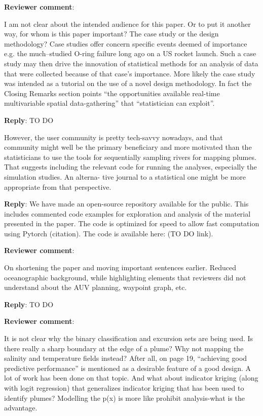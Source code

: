 \documentclass[a4paper]{article}
\newcounter{reviewer}
\def\revcom{\textbf{Reviewer comment}}
\def\reply{\textbf{Reply}}
\begin{document}
\begin{answers}
\item{\revcom  :}\label{r1c4}

I am not clear about the intended audience for this paper. Or to put it another way, for whom is this paper important? The case study or the
design methodology? Case studies offer concern specific events deemed of importance e.g. the much–studied O-ring failure long ago on a US rocket launch. Such a case study may then drive the innovation of statistical methods for an analysis of data that were collected because of that case’s importance. More likely the case study was intended as a tutorial on the use of a novel design methodology. In fact the Closing Remarks section points “the opportunities available real-time multivariable spatial data-gathering” that “statistician can exploit”.

\reply: TO DO

However, the user community is pretty tech-savvy nowadays, and that community might well be the primary beneficiary and more motivated than the statisticians to use the tools for sequentially sampling rivers for mapping plumes. That suggests including the relevant code for running the analyses, especially the simulation studies. An alterna- tive journal to a statistical one might be more appropriate from that perspective.

\reply: We have made an open-source repository available for the public. This includes commented code examples for exploration and analysis of the material presented in the paper. The code is optimized for speed to allow fast computation using Pytorch (citation). The code is available here: (TO DO link). 

\item{\revcom :}\label{r1c5}

On shortening the paper and moving important sentences earlier. Reduced oceanographic background, while highlighting elements that reviewers did not understand about the AUV planning, waypoint graph, etc.

\reply: TO DO

\item{\revcom :}\label{r1c6}

It is not clear why the binary classification and excursion sets are being used. Is there really a sharp boundary at the edge of a plume? Why not mapping the salinity and temperature fields instead? After all, on page 19, “achieving good predictive performance” is mentioned as a desirable feature of a good design. A lot of work has been done on that topic. And what about indicator kriging (along with logit regression) that generalizes indicator kriging that has been used to identify plumes? Modelling the p(x) is more like prohibit analysis-what is the advantage.


\end{answers}
\end{document}
